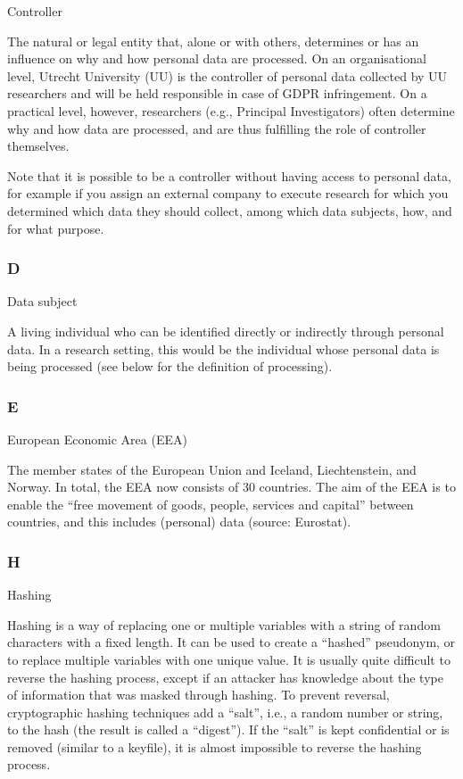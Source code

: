 \documentclass[
]{book}
\begin{document}
Controller

The natural or legal entity that, alone or with others, determines or has an influence on why and how
personal data are processed. On an organisational level, Utrecht University (UU) is the controller of personal data
collected by UU researchers and will be held responsible in case of GDPR infringement. On a practical level, however,
researchers (e.g., Principal Investigators) often determine why and how data are processed, and are thus fulfilling the
role of controller themselves.

Note that it is possible to be a controller without having access to personal
data, for example if you assign an external company to execute research for
which you determined which data they should collect, among which data subjects,
how, and for what purpose.

\hypertarget{d}{%
\subsubsection{D}\label{d}}

Data subject

A living individual who can be identified directly or indirectly through personal data. In a research setting,
this would be the individual whose personal data is being processed (see below for the definition of processing).

\hypertarget{e}{%
\subsubsection{E}\label{e}}

European Economic Area (EEA)

The member states of the European Union and Iceland, Liechtenstein, and Norway. In total, the EEA now consists of
30 countries. The aim of the EEA is to enable the ``free movement of goods, people, services and capital'' between countries,
and this includes (personal) data (source:
Eurostat).

\hypertarget{h}{%
\subsubsection{H}\label{h}}

Hashing

Hashing is a way of replacing one or multiple variables with a string of
random characters with a fixed length. It can be used to create a ``hashed''
pseudonym, or to replace multiple variables with one unique value. It is
usually quite difficult to reverse the hashing process, except if an attacker
has knowledge about the type of information that was masked through hashing.
To prevent reversal, cryptographic hashing techniques add a ``salt'', i.e., a
random number or string, to the hash (the result is called a ``digest''). If
the ``salt'' is kept confidential or is removed (similar to a keyfile), it is
almost impossible to reverse the hashing process.
\end{document}
